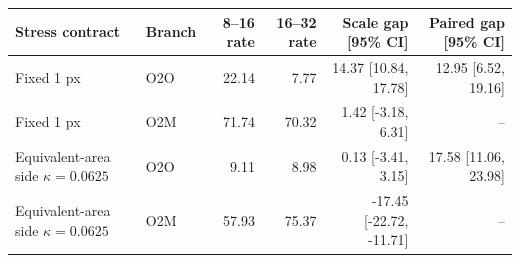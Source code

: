 \begin{tabular}{llrrrr}
\toprule
Stress contract & Branch & 8--16 rate & 16--32 rate & Scale gap [95\% CI] & Paired gap [95\% CI] \\
\midrule
Fixed 1 px & O2O & 22.14 & 7.77 & 14.37 [10.84, 17.78] & 12.95 [6.52, 19.16] \\
Fixed 1 px & O2M & 71.74 & 70.32 & 1.42 [-3.18, 6.31] & -- \\
Equivalent-area side $\kappa=0.0625$ & O2O & 9.11 & 8.98 & 0.13 [-3.41, 3.15] & 17.58 [11.06, 23.98] \\
Equivalent-area side $\kappa=0.0625$ & O2M & 57.93 & 75.37 & -17.45 [-22.72, -11.71] & -- \\
\bottomrule
\end{tabular}
